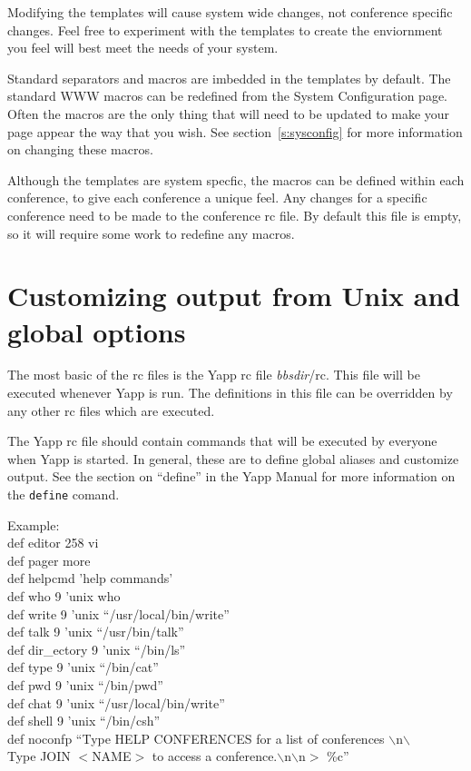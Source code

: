 \documentclass[twoside]{report}
\begin{document}
      \vspace{12pt}

      Modifying the templates will cause system wide changes, not 
      conference specific changes.  Feel free to experiment with the
      templates to create the enviornment you feel will best meet the
      needs of your system.  

      Standard separators and macros are imbedded in the templates by default.
      The standard WWW macros can be redefined from the  System Configuration 
      page. Often the macros are the only thing that will need to be 
      updated to make your page appear the way that you wish.  See 
      section~\ref{s:sysconfig} for more information on changing these 
      macros.  

      Although the templates are system specfic, the macros can be defined
      within each conference, to give each conference a unique feel.  
      Any changes for a specific conference need to be made to the conference
      rc file.  By default this file is empty, so it will require some work
      to redefine any macros.

   \section{Customizing output from Unix and global options} \label{s:rc}
      The most basic of the rc files is the Yapp
      rc file {\em bbsdir}/rc. This file will be executed whenever Yapp is 
      run.  The definitions in this file can be overridden by any other rc 
      files which are executed. 

      The Yapp rc file should contain commands that will be executed by 
      everyone when Yapp is started.  In general, these are to define global 
      aliases and customize output.  See the section on ``define'' in the Yapp 
      Manual for more information on the {\tt define} comand.

      \qquad Example: \\
      \qquad def editor 258 vi \\
      \qquad def pager more \\
      \qquad def helpcmd 'help commands' \\
      \qquad def who       9   'unix who \\
      \qquad def write     9   'unix ``/usr/local/bin/write'' \\
      \qquad def talk      9   'unix ``/usr/bin/talk'' \\
      \qquad def dir\_ectory 9 'unix ``/bin/ls'' \\
      \qquad def type  9 'unix ``/bin/cat'' \\
      \qquad def pwd   9 'unix ``/bin/pwd'' \\
      \qquad def chat  9 'unix ``/usr/local/bin/write'' \\
      \qquad def shell 9 'unix ``/bin/csh'' \\
      \qquad def noconfp ``Type HELP CONFERENCES for a list of conferences
$\backslash$n$\backslash$\\
Type JOIN $<$NAME$>$ to access a conference.$\backslash$n$\backslash$n$>$ \%c'' \\
\end{document}

